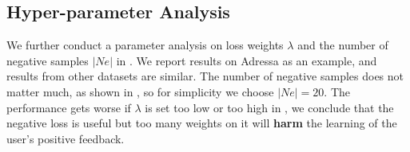 \subsection{Hyper-parameter Analysis}
We further conduct a parameter analysis on loss weights $\lambda$ and the number of negative samples $|Ne|$ 
in . We report results on Adressa as an example, and results from other datasets are similar. 
The number of negative samples does not matter much, as shown in , 
so for simplicity we choose $|Ne|=20$. The performance gets worse if $\lambda$ is set too low or too 
high in , we conclude that the negative loss is useful but too many weights on it will \textbf{harm} the learning of the user's positive feedback.

